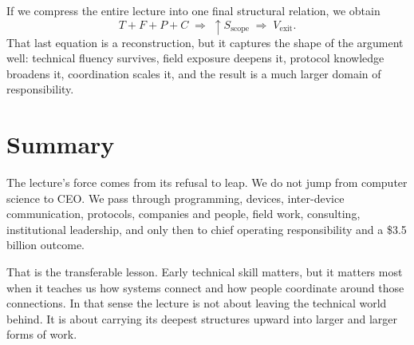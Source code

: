 If we compress the entire lecture into one final structural relation, we obtain
\begin{equation}
T + F + P + C \;\Longrightarrow\; \uparrow S_{\text{scope}} \;\Longrightarrow\; V_{\text{exit}}.
\end{equation}
That last equation is a reconstruction, but it captures the shape of the argument well: technical fluency survives, field exposure deepens it, protocol knowledge broadens it, coordination scales it, and the result is a much larger domain of responsibility.

\section{Summary}

The lecture's force comes from its refusal to leap. We do not jump from computer science to CEO. We pass through programming, devices, inter-device communication, protocols, companies and people, field work, consulting, institutional leadership, and only then to chief operating responsibility and a \$3.5 billion outcome.

That is the transferable lesson. Early technical skill matters, but it matters most when it teaches us how systems connect and how people coordinate around those connections. In that sense the lecture is not about leaving the technical world behind. It is about carrying its deepest structures upward into larger and larger forms of work.